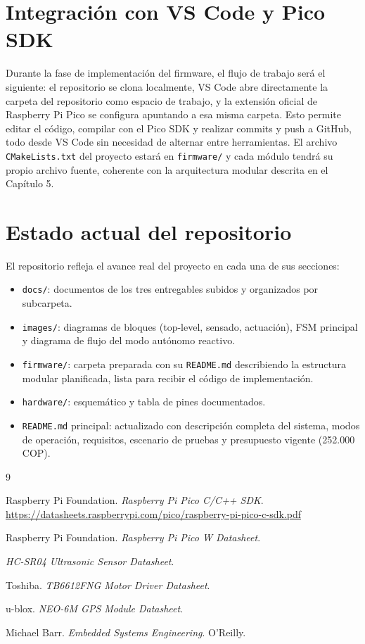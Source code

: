 \documentclass[12pt]{report}
\begin{document}
\section{Integración con VS Code y Pico SDK}
 
Durante la fase de implementación del firmware, el flujo de trabajo será el siguiente: el repositorio se clona localmente, VS Code abre directamente la carpeta del repositorio como espacio de trabajo, y la extensión oficial de Raspberry Pi Pico se configura apuntando a esa misma carpeta. Esto permite editar el código, compilar con el Pico SDK y realizar commits y push a GitHub, todo desde VS Code sin necesidad de alternar entre herramientas. El archivo \texttt{CMakeLists.txt} del proyecto estará en \texttt{firmware/} y cada módulo tendrá su propio archivo fuente, coherente con la arquitectura modular descrita en el Capítulo 5.
 
\section{Estado actual del repositorio}
 
El repositorio refleja el avance real del proyecto en cada una de sus secciones:
 
\begin{itemize}
    \item \texttt{docs/}: documentos de los tres entregables subidos y organizados por subcarpeta.
    \item \texttt{images/}: diagramas de bloques (top-level, sensado, actuación), FSM principal y diagrama de flujo del modo autónomo reactivo.
    \item \texttt{firmware/}: carpeta preparada con su \texttt{README.md} describiendo la estructura modular planificada, lista para recibir el código de implementación.
    \item \texttt{hardware/}: esquemático y tabla de pines documentados.
    \item \texttt{README.md} principal: actualizado con descripción completa del sistema, modos de operación, requisitos, escenario de pruebas y presupuesto vigente (252.000 COP).
\end{itemize}

\begin{thebibliography}{9}

Raspberry Pi Foundation. \textit{Raspberry Pi Pico C/C++ SDK}. \url{https://datasheets.raspberrypi.com/pico/raspberry-pi-pico-c-sdk.pdf}

Raspberry Pi Foundation. \textit{Raspberry Pi Pico W Datasheet}.

\textit{HC-SR04 Ultrasonic Sensor Datasheet}.

Toshiba. \textit{TB6612FNG Motor Driver Datasheet}.

u-blox. \textit{NEO-6M GPS Module Datasheet}.

Michael Barr. \textit{Embedded Systems Engineering}. O'Reilly.

\end{thebibliography}
\end{document}
